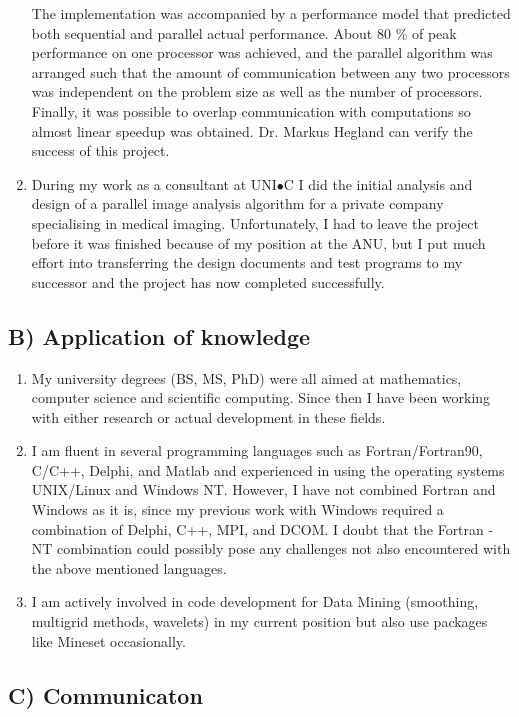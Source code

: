 \documentclass[12pt,a4paper]{article}
\begin{document}
\begin{enumerate}
  The implementation was accompanied by a performance model that
  predicted both sequential and parallel actual performance.
  About 80 \% of peak performance on one processor was achieved,
  and the parallel algorithm was arranged such that the amount of
  communication between any two processors was independent on the problem size
  as well as the number of processors. 
  Finally, it was possible to overlap communication with computations
  so almost linear speedup was obtained. Dr. Markus Hegland can verify 
  the success of this project.
  \item During my work as a consultant at UNI$\bullet$C 
  I did the initial analysis and design of a parallel image analysis
  algorithm for a private company specialising in medical imaging.
  Unfortunately, I had to leave the project before it was finished
  because of my position at the ANU, but I put much effort into 
  transferring the design documents and test programs to 
  my successor and the project has now completed successfully.
\end{enumerate} 

\subsection*{B) Application of knowledge}
 
\begin{enumerate} 
 \item My university degrees (BS, MS, PhD) were all aimed at mathematics, 
 computer science and scientific computing. Since then I have been working
 with either research or actual development in these fields.
 \item I am fluent in several programming languages such as
 Fortran/Fortran90, C/C++, Delphi, and Matlab 
 and experienced in using the operating systems UNIX/Linux and Windows NT. 
 However, I have not combined Fortran and Windows as it is, since my previous 
 work with Windows required a combination of Delphi, C++, MPI, and DCOM.
 I doubt that the Fortran - NT combination could possibly pose any 
 challenges not also encountered with the above mentioned languages.
 \item I am actively involved in code development for Data Mining
 (smoothing, multigrid methods, wavelets) in my current position but 
 also use packages like Mineset occasionally.
\end{enumerate} 

\subsection*{C) Communicaton}
 
\end{document}

